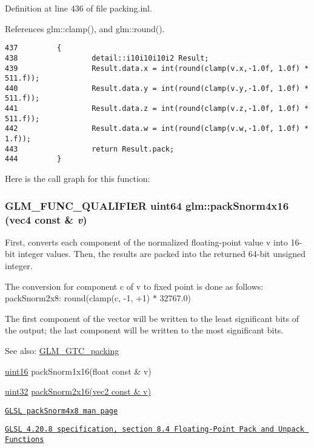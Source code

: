 Definition at line 436 of file packing.inl.

References glm::clamp(), and glm::round().

\begin{Code}\begin{verbatim}437         {
438                 detail::i10i10i10i2 Result;
439                 Result.data.x = int(round(clamp(v.x,-1.0f, 1.0f) * 511.f));
440                 Result.data.y = int(round(clamp(v.y,-1.0f, 1.0f) * 511.f));
441                 Result.data.z = int(round(clamp(v.z,-1.0f, 1.0f) * 511.f));
442                 Result.data.w = int(round(clamp(v.w,-1.0f, 1.0f) *   1.f));
443                 return Result.pack;
444         }
\end{verbatim}
\end{Code}




Here is the call graph for this function:\hypertarget{group__gtc__packing_g9b237d7c66b7a71964e6d1f4dc06539f}{
\subsubsection[packSnorm4x16]{\setlength{\rightskip}{0pt plus 5cm}GLM\_\-FUNC\_\-QUALIFIER uint64 glm::packSnorm4x16 (vec4 const \& {\em v})}}
\label{group__gtc__packing_g9b237d7c66b7a71964e6d1f4dc06539f}


First, converts each component of the normalized floating-point value v into 16-bit integer values. Then, the results are packed into the returned 64-bit unsigned integer.

The conversion for component c of v to fixed point is done as follows: packSnorm2x8: round(clamp(c, -1, +1) $\ast$ 32767.0)

The first component of the vector will be written to the least significant bits of the output; the last component will be written to the most significant bits.

\begin{Desc}
\item[See also:]\hyperlink{group__gtc__packing}{GLM\_\-GTC\_\-packing} 

\hyperlink{group__gtc__type__precision_gd8c2939e1fdd8e5828b31d95c52255d5}{uint16} packSnorm1x16(float const \& v) 

\hyperlink{group__gtc__type__precision_g202b6a53c105fcb7e531f9b443518451}{uint32} \hyperlink{group__core__func__packing_g0c8005de240d6c4ca3d16c7bee25c622}{packSnorm2x16(vec2 const \& v)} 

\href{http://www.opengl.org/sdk/docs/manglsl/xhtml/packSnorm4x8.xml}{\tt GLSL packSnorm4x8 man page} 

\href{http://www.opengl.org/registry/doc/GLSLangSpec.4.20.8.pdf}{\tt GLSL 4.20.8 specification, section 8.4 Floating-Point Pack and Unpack Functions} \end{Desc}


